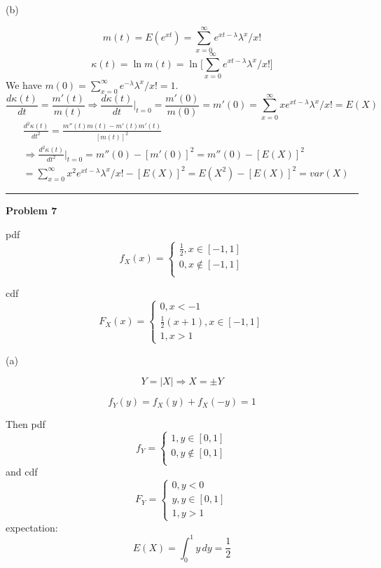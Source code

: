 \documentclass[letterpaper, 11pt]{article}
\newcommand{\1}{\mathds{1}}	%
\theoremstyle{definition}
\begin{document}
(b)

\[
    m(t) = E(e^{xt}) =  \sum_{x=0}^{\infty } e^{xt - \lambda}\lambda^{x}/x!
\]
\[
    \kappa(t) = \ln m(t) = \ln \Big[ \sum_{x=0}^{\infty } e^{xt - \lambda}\lambda^{x}/x! \Big]
\]
We have $m(0) = \sum_{x=0}^{\infty } e^{- \lambda}\lambda^{x}/x! = 1$.
\[
    \frac{d \kappa(t)}{dt} = \frac{m'(t)}{m(t)} \Longrightarrow  \frac{d \kappa(t)}{dt}\Big|_{t=0} = \frac{m'(0)}{m(0)} = m'(0) = \sum_{x=0}^{\infty }x e^{xt - \lambda}\lambda^{x}/x! = E(X)
\]
\begin{align*}
     & \frac{d^2 \kappa(t)}{dt^2} = \frac{m''(t)m(t) - m'(t)m'(t)}{[m(t)]^{2}}                                \\
     & \Longrightarrow  \frac{d^2 \kappa(t)}{dt^2}\Big|_{t=0} = m''(0) -[ m'(0)]^{2} =  m''(0) - [E(X)]^{2}   \\
     & = \sum_{x=0}^{\infty } x^2 e^{xt - \lambda}\lambda^{x}/x! - [E(X)]^{2}  = E(X^2) - [E(X)]^{2} = var(X)
\end{align*}

\bigskip
\hrule
\bigskip

\textbf{Problem 7}

pdf
\[
    f_X(x) = \left\{\begin{array}{l}
        \frac{1}{2}, x \in [-1,1] \\
        0, x \notin [-1,1]        \\
    \end{array}\right.
\]

cdf \[
    F_X(x) = \left\{\begin{array}{l}
        0, x < -1                      \\
        \frac{1}{2}(x+1), x \in [-1,1] \\
        1, x > 1
    \end{array}\right.
\]

(a)

\[
    Y = \left| X \right| \Longrightarrow X = \pm Y
\]

\[
    f_Y(y) = f_X(y) + f_X(-y) = 1
\]

Then pdf \[
    f_Y = \left\{\begin{array}{l}
        1, y \in [0,1]    \\
        0, y \notin [0,1] \\
    \end{array}\right.
\]
and cdf \[
    F_Y = \left\{\begin{array}{l}
        0, y < 0       \\
        y, y \in [0,1] \\
        1, y > 1
    \end{array}\right.
\]
expectation: \[
    E(X) = \int_{0}^{1} y \, dy = \frac{1}{2}
\]
\end{document}
